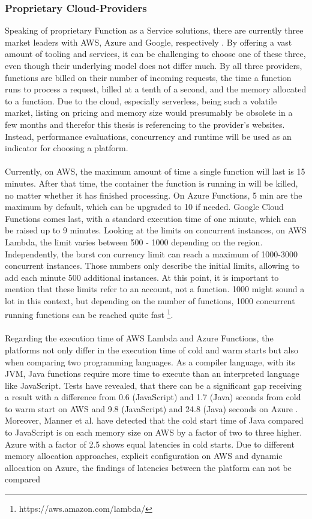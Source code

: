 \documentclass[11pt]{article}
\begin{document}
\subsubsection{Proprietary Cloud-Providers}
Speaking of proprietary Function as a Service solutions, there are currently three market leaders with AWS, Azure and Google, respectively \cite{kumar2019serverless}. By offering a vast amount of tooling and services, it can be challenging to choose one of these three, even though their underlying model does not differ much. By all three providers, functions are billed on their number of incoming requests, the time a function runs to process a request, billed at a tenth of a second, and the memory allocated to a function. Due to the cloud, especially serverless, being such a volatile market, listing on pricing and memory size would presumably be obsolete in a few months and therefor this thesis is referencing to the provider's websites. Instead, performance evaluations, concurrency and runtime will be used as an indicator for choosing a platform.\\\\ Currently, on AWS, the maximum amount of time a single function will last is 15 minutes. After that time, the container the function is running in will be killed, no matter whether it has finished processing. On Azure Functions, 5 min are the maximum by default, which can be upgraded to 10 if needed. Google Cloud Functions comes last, with a standard execution time of one minute, which can be raised up to 9 minutes. Looking at the limits on concurrent instances, on AWS Lambda, the limit varies between 500 - 1000 depending on the region. Independently, the burst con  currency limit can reach a maximum of 1000-3000 concurrent instances. Those numbers only describe the initial limits, allowing to add each minute 500 additional instances. At this point, it is important to mention that these limits refer to an account, not a function. 1000 might sound a lot in this context, but depending on the number of functions, 1000 concurrent running functions can be reached quite fast \footnote{https://aws.amazon.com/lambda/}.\\\\ Regarding the execution time of AWS Lambda and Azure Functions, the platforms not only differ in the execution time of cold and warm starts but also when comparing two programming languages. As a compiler language, with its JVM, Java functions require more time to execute than an interpreted language like JavaScript. Tests have revealed, that there can be a significant gap receiving a result with a difference from 0.6 (JavaScript) and 1.7 (Java) seconds from cold to warm start on AWS and 9.8 (JavaScript) and 24.8 (Java) seconds on Azure \cite{manner2018cold}. Moreover, Manner et al. have detected that the cold start time of Java compared to JavaScript is on each memory size on AWS by a factor of two to three higher. Azure with a factor of 2.5 shows equal latencies in cold starts. Due to different memory allocation approaches, explicit configuration on AWS and dynamic allocation on Azure, the findings of latencies between the platform can not be compared 
\end{document}
